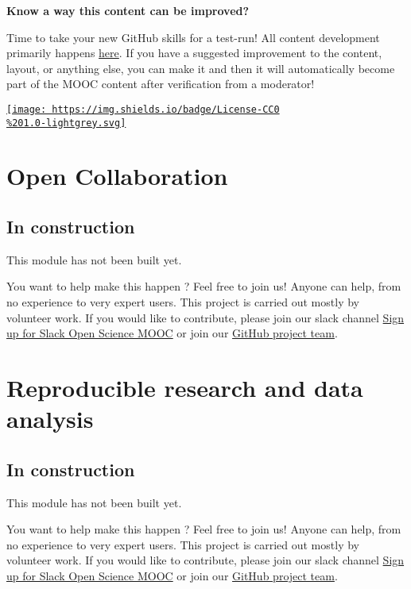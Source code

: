 \documentclass[]{book}
\begin{document}
\textbf{Know a way this content can be improved?}

Time to take your new GitHub skills for a test-run! All content development primarily happens \href{https://github.com/OpenScienceMOOC/Module-1-Open-Principles/blob/master/content_development/MAIN.md}{here}. If you have a suggested improvement to the content, layout, or anything else, you can make it and then it will automatically become part of the MOOC content after verification from a moderator!

\href{https://creativecommons.org/publicdomain/zero/1.0/}{\texttt{[image: https://img.shields.io/badge/License-CC0\\\%201.0-lightgrey.svg]}}

\hypertarget{module2}{%
\chapter{Open Collaboration}\label{module2}}

\hypertarget{in-construction}{%
\section{In construction}\label{in-construction}}

This module has not been built yet.

You want to help make this happen ? Feel free to join us! Anyone can help, from no experience to very expert users. This project is carried out mostly by volunteer work. If you would like to contribute, please join our slack channel \href{https://osmooc.herokuapp.com/}{Sign up for Slack Open Science MOOC} or join our \href{https://open-science-mooc-invite.herokuapp.com/}{GitHub project team}.

\hypertarget{module3}{%
\chapter{Reproducible research and data analysis}\label{module3}}

\hypertarget{in-construction-1}{%
\section{In construction}\label{in-construction-1}}

This module has not been built yet.

You want to help make this happen ? Feel free to join us! Anyone can help, from no experience to very expert users. This project is carried out mostly by volunteer work. If you would like to contribute, please join our slack channel \href{https://osmooc.herokuapp.com/}{Sign up for Slack Open Science MOOC} or join our \href{https://open-science-mooc-invite.herokuapp.com/}{GitHub project team}.
\end{document}
